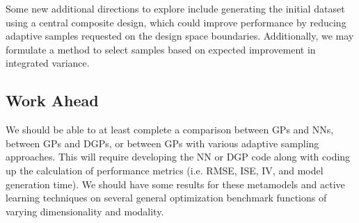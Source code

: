 \documentclass[conference]{IEEEtran}
\begin{document}
Some new additional directions to explore include generating the initial dataset using a central composite design, which could improve performance by reducing adaptive samples requested on the design space boundaries. Additionally, we may formulate a method to select samples based on expected improvement in integrated variance.

\subsection{Work Ahead}
We should be able to at least complete a comparison between GPs and NNs, between GPs and DGPs, or between GPs with various adaptive sampling approaches. This will require developing the NN or DGP code along with coding up the calculation of performance metrics (i.e. RMSE, ISE, IV, and model generation time). We should have some results for these metamodels and active learning techniques on several general optimization benchmark functions of varying dimensionality and modality.
\end{document}
